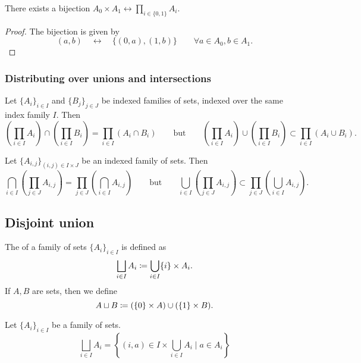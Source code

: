 \begin{lemma}
There exists a bijection $A_0\times A_1 \leftrightarrow \prod_{i\in\{0,1\}} A_i$.
\end{lemma}
\begin{proof}
The bijection is given by
\[ (a,b) \quad\leftrightarrow\quad \{(0,a),(1,b)\} \qquad \forall a\in A_0, b\in A_1. \]
\end{proof}

\subsubsection{Distributing over unions and intersections}
\begin{lemma}
Let $\{A_{i}\}_{i \in I}$ and $\{B_{j}\}_{j \in J}$ be indexed families of sets, indexed over the same index family $I$. Then
\[ \left(\prod_{i\in I}A_i\right)\cap\left(\prod_{i\in I}B_i\right) = \prod_{i\in I}(A_i\cap B_i) \qquad\text{but}\qquad \left(\prod_{i\in I}A_i\right)\cup\left(\prod_{i\in I}B_i\right) \subset \prod_{i\in I}(A_i\cup B_i). \]
\end{lemma}

\begin{lemma}
Let $\{A_{i,j}\}_{(i,j) \in I\times J}$ be an indexed family of sets. Then
\[ \bigcap_{i\in I}\left(\prod_{j\in J}A_{i,j}\right) = \prod_{j\in J}\left(\bigcap_{i\in I}A_{i,j}\right) \qquad\text{but}\qquad \bigcup_{i\in I}\left(\prod_{j\in J}A_{i,j}\right) \subset \prod_{j\in J}\left(\bigcup_{i\in I}A_{i,j}\right). \]
\end{lemma}

\subsection{Disjoint union}
\begin{definition}
The  of a family of sets $\{A_i\}_{i\in I}$ is defined as
\[ \bigsqcup_{i\in I}A_i \coloneqq \bigcup_{i\in I}\{i\}\times A_i. \]
If $A,B$ are sets, then we define
\[ A\sqcup B \coloneqq (\{0\}\times A)\cup (\{1\}\times B). \]
\end{definition}

\begin{lemma}
Let $\{A_i\}_{i\in I}$ be a family of sets.
\[ \bigsqcup_{i\in I}A_i = \left\{ (i,a)\in I\times \bigcup_{i\in I}A_i \;|\; a\in A_i \right\} \]
\end{lemma}

